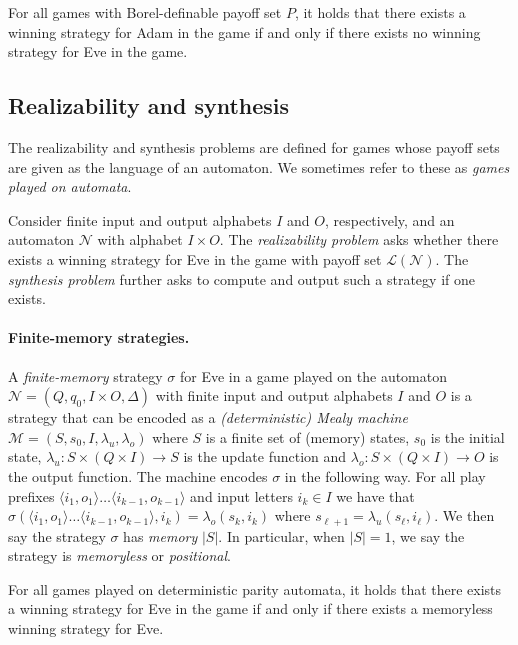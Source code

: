 \documentclass[runningheads,a4paper,draft]{llncs}
\newcommand{\eve}{Eve\xspace}
\newcommand{\adam}{Adam\xspace}
\newcommand{\calN}{\mathcal{N}}
\newcommand{\calM}{\mathcal{M}}
\newcommand{\lang}[1]{\mathcal{L}({#1})}
\begin{document}
\begin{proposition}
  For all games with Borel-definable payoff set $P$, it holds that there
  exists a winning strategy for \adam in the game if and only if there exists
  no winning strategy for \eve in the game.
\end{proposition}

\subsection{Realizability and synthesis}
The realizability and synthesis problems are defined for games whose payoff sets
are given as the language of an automaton. We sometimes refer to these as
\emph{games played on automata}.
\begin{definition}[Problems]
  Consider finite input and output alphabets $I$ and $O$, respectively, and
  an automaton $\calN$ with alphabet $I \times O$.
  The \emph{realizability problem} asks whether
  there exists a winning strategy for \eve in the game with payoff set 
  $\lang{\calN}$. The \emph{synthesis problem}
  further asks to compute and output such a strategy if one exists.
\end{definition}

\paragraph{Finite-memory strategies.}
A \emph{finite-memory} strategy $\sigma$ for \eve in a game played on the
automaton $\calN =
(Q,q_0,I \times O,\Delta)$ with finite input and
output alphabets $I$ and $O$ is a strategy that can be encoded as a
\emph{(deterministic) Mealy machine} $\calM = (S,s_0,I, \lambda_u,\lambda_o)$
where $S$ is a finite set of (memory) states, $s_0$ is the initial state,
$\lambda_u : S \times (Q \times I) \to S$ is the update function and $\lambda_o
: S \times (Q \times I) \to O$ is the output function. The machine encodes
$\sigma$ in the following way. For all play prefixes $\langle i_1,  o_1\rangle
\dots \langle i_{k-1}, o_{k-1} \rangle$ and input letters $i_k \in I$ we have
that $\sigma(\langle i_1, o_1\rangle \dots \langle i_{k-1}, o_{k-1} \rangle,
i_k) = \lambda_o(s_k,i_k)$ where $s_{\ell + 1} =
\lambda_u(s_\ell,i_\ell)$. We then say the strategy $\sigma$ has \emph{memory}
$|S|$. In particular, when $|S| = 1$, we say the strategy is \emph{memoryless}
or \emph{positional}.

\begin{proposition}
  For all games played on deterministic parity automata, it holds that there
  exists a winning strategy for \eve in the game if and only if there exists a
  memoryless winning strategy for \eve.
\end{proposition}
\end{document}

